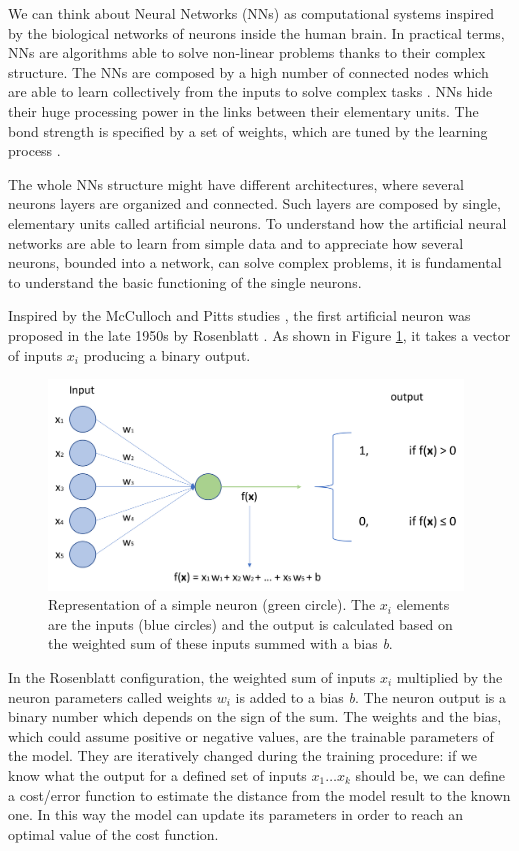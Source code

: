 \documentclass[../main.tex]{subfiles}
\begin{document}
We can think about Neural Networks (NNs) as computational systems inspired by the biological networks of neurons inside the human brain. 
In practical terms, NNs are algorithms able to solve non-linear problems thanks to their complex structure.
The NNs are composed by a high number of connected nodes which are able to learn collectively from the inputs to solve complex tasks \cite{o2015introduction-cnn}.
NNs hide their huge processing power in the links between their elementary units.
The bond strength is  specified by a set of weights, which are tuned by the learning process \cite{gurney2018neural-networks}.

The whole NNs structure might have different architectures, where several neurons layers are organized and connected.
Such layers are composed by single, elementary units called artificial neurons.
To understand how the artificial neural networks are able to learn from simple data and to appreciate how several neurons, bounded into a network, can solve complex problems, it is fundamental to understand the basic functioning of the single neurons.

Inspired by the McCulloch and Pitts studies \cite{mcculloch1943logical-neural-network}, the first artificial neuron was proposed in the late 1950s by Rosenblatt \cite{rosenblatt1958perceptron}.
As shown in Figure \ref{fig:perceptron}, it takes a vector of inputs $x_i$ producing a binary output.

\begin{figure}[H] 
\begin{center}
\includegraphics[width=11cm]{images/Perceptron.png}
\caption{\small{Representation of a simple neuron (green circle). The $x_i$ elements are the inputs (blue circles) and the output is calculated based on the weighted sum of these inputs summed with a bias \textit{b}.}}\label{fig:perceptron}
\end{center}
\end{figure}
In the Rosenblatt configuration, the weighted sum of inputs $x_i$ multiplied by the neuron parameters called weights $w_i$ is added to a bias \textit{b}. 
The neuron output is a binary number which depends on the sign of the sum. 
The weights and the bias, which could assume positive or negative values, are the trainable parameters of the model.
They are iteratively changed during the training procedure: if we know what the output for a defined set of inputs $x_{1} \dots x_k$ should be, we can define a cost/error function to estimate the distance from the model result to the known one. 
In this way the model can update its parameters in order to reach an optimal value of the cost function.
\end{document}
